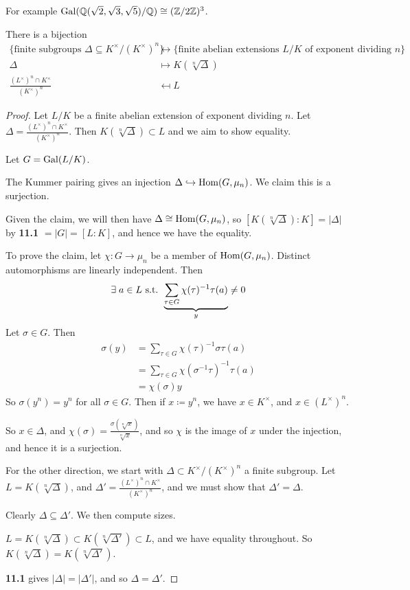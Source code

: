 \documentclass[10pt,a4paper]{article}
\begin{document}
For example $\operatorname{Gal}(\mathbb{Q}(\sqrt{2}, \sqrt{3}, \sqrt{5})/\mathbb{Q}) \cong (\mathbb{Z}/2\mathbb{Z})^3$.
\begin{theorem}
  There is a bijection
  \begin{align*}
    \{\text{finite subgroups }\Delta \subseteq K^\times/(K^\times)^n\} &\leftrightarrow \{\text{finite abelian extensions }L/K\text{ of exponent dividing $n$}\}\\
    \Delta &\mapsto K(\sqrt[n]{\Delta})\\
    \frac{(L^\times)^n \cap K^\times}{(K^\times)^n} &\mapsfrom L
  \end{align*}
\end{theorem}
\begin{proof}
  Let $L/K$ be a finite abelian extension of exponent dividing $n$. Let $\Delta = \frac{(L^\times)^n \cap K^\times}{(K^\times)^n}$. Then $K(\sqrt[n]{\Delta}) \subset L$ and we aim to show equality.

  Let $G = \operatorname{Gal}(L/K)$.

  The Kummer pairing gives an injection $\Delta \hookrightarrow \operatorname{Hom}(G, \mu_n)$. We claim this is a surjection.

  Given the claim, we will then have $\Delta \cong \operatorname{Hom}(G, \mu_n)$, so $[K(\sqrt[n]{\Delta}):K] = |\Delta|$ by \textbf{11.1} $= |G| = [L:K]$, and hence we have the equality.

  To prove the claim, let $\chi:G \to \mu_n$ be a member of $\operatorname{Hom}(G, \mu_n)$. Distinct automorphisms are linearly independent. Then
  \[\exists a \in L \st \underbrace{\sum_{\tau \in G} \chi(\tau)^{-1} \tau(a)}_y \neq 0\]
  Let $\sigma \in G$. Then
  \begin{align*}
    \sigma(y) &= \sum_{\tau \in G} \chi(\tau)^{-1}\sigma\tau(a)\\
    &= \sum_{\tau\in G}\chi(\sigma^{-1}\tau)^{-1}\tau(a)\\
    &= \chi(\sigma)y
  \end{align*}
  So $\sigma(y^n) = y^n$ for all $\sigma \in G$. Then if $x \coloneqq y^n$, we have $x \in K^\times$, and $x \in (L^\times)^n$.

  So $x \in \Delta$, and $\chi(\sigma) = \frac{\sigma(\sqrt[n]{x})}{\sqrt[n]{x}}$, and so $\chi$ is the image of $x$ under the injection, and hence it is a surjection.

  For the other direction, we start with $\Delta \subset K^\times/(K^\times)^n$ a finite subgroup. Let $L = K(\sqrt[n]{\Delta})$, and $\Delta' = \frac{(L^\times)^n\cap K^\times}{(K^\times)^n}$, and we must show that $\Delta' = \Delta$.

  Clearly $\Delta \subseteq \Delta'$. We then compute sizes.

  $L = K(\sqrt[n]{\Delta}) \subset K(\sqrt[n]{\Delta'}) \subset L$, and we have equality throughout. So $K(\sqrt[n]{\Delta}) = K(\sqrt[n]{\Delta'})$.

  \textbf{11.1} gives $|\Delta| = |\Delta'|$, and so $\Delta = \Delta'$.
\end{proof}
\end{document}
